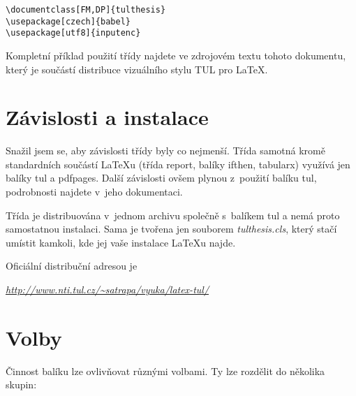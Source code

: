 \documentclass[FF,fonts]{tulthesis}
\newcommand{\argument}[1]{{\ttfamily\color{\tulcolor}#1}}
\newenvironment{myquote}{\begin{list}{}{\setlength\leftmargin\parindent}\item[]}{\end{list}}
\newenvironment{listing}{\begin{myquote}\color{\tulcolor}}{\end{myquote}}
\begin{document}
\begin{listing}
\begin{verbatim}
\documentclass[FM,DP]{tulthesis}
\usepackage[czech]{babel}
\usepackage[utf8]{inputenc}
\end{verbatim}
\end{listing}

Kompletní příklad použití třídy najdete ve zdrojovém textu tohoto dokumentu,
který je součástí distribuce vizuálního stylu TUL pro \LaTeX.


\chapter{Závislosti a instalace}

Snažil jsem se, aby závislosti třídy byly co nejmenší. Třída samotná kromě
standardních součástí \LaTeX u (třída \argument{report}, balíky
\argument{ifthen}, \argument{tabularx}) využívá jen balíky \argument{tul} a
\argument{pdfpages}. Další závislosti ovšem plynou z~použití balíku
\argument{tul}, podrobnosti najdete v~jeho dokumentaci.

Třída je distribuována v~jednom archivu společně s~balíkem \argument{tul} a
nemá proto samostatnou instalaci. Sama je tvořena jen souborem
\emph{tulthesis.cls}, který stačí umístit kamkoli, kde jej vaše instalace
\LaTeX u najde. 

Oficiální distribuční adresou je

\begin{listing}
\href{http://www.nti.tul.cz/~satrapa/vyuka/latex-tul/}{\emph{http://www.nti.tul.cz/\textasciitilde satrapa/vyuka/latex-tul/}}
\end{listing}


\chapter{Volby}\label{volby}

Činnost balíku lze ovlivňovat různými volbami. Ty lze rozdělit do několika
skupin:
\end{document}
